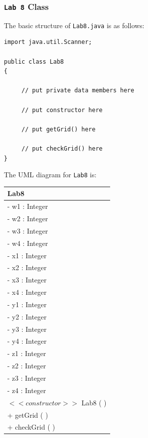 \subsubsection*{ {\tt Lab 8} Class}
\noindent The basic structure of {\tt Lab8.java} is as follows:
\begin{verbatim}
import java.util.Scanner;

public class Lab8
{

     // put private data members here

     // put constructor here

     // put getGrid() here

     // put checkGrid() here
}
\end{verbatim}
The UML diagram for {\tt Lab8} is:
\begin{tabular}{|l|}
\hline
\textbf{ Lab8} \\
\hline
- w1 : Integer\\
- w2 : Integer\\
- w3 : Integer\\
- w4 : Integer\\
- x1 : Integer\\
- x2 : Integer\\
- x3 : Integer\\
- x4 : Integer\\
- y1 : Integer\\
- y2 : Integer\\
- y3 : Integer\\
- y4 : Integer\\
- z1 : Integer\\
- z2 : Integer\\
- z3 : Integer\\
- z4 : Integer\\
\hline
$<<constructor>>$ Lab8 ( )\\
\hline
+ getGrid ( )\\
+ checkGrid ( )\\
\hline
\end{tabular}

